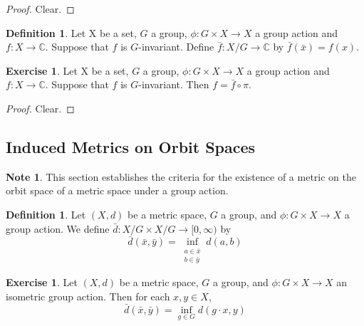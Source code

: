 \documentclass[12pt]{amsart}
\theoremstyle{definition}
\newtheorem{defn}[definition]{Definition}
\newtheorem{note}[definition]{Note}
\newtheorem{ex}[definition]{Exercise}
\newcommand{\C}{\mathbb{C}}
\newcommand{\Rg}{[0,\infty)}
\newcommand{\lex}[1]{\label{ex:#1}}
\newcommand{\ld}[1]{\label{defn:#1}}
\begin{document}
	\begin{proof}
	Clear.
	\end{proof}
	
	\begin{defn}
	Let X be a set, $G$ a group, $\phi: G \times X \rightarrow X$ a group action and $f:X \rightarrow \C$. Suppose that $f$ is $G$-invariant. Define $\bar{f}:X/ G \rightarrow \C$ by $\bar{f}(\bar{x}) = f(x)$. 
	\end{defn}
	
	\begin{ex}
	Let X be a set, $G$ a group, $\phi: G \times X \rightarrow X$ a group action and $f:X \rightarrow \C$. Suppose that $f$ is $G$-invariant. Then $f = \bar{f} \circ \pi$. 
	\end{ex}
	
	\begin{proof}
	Clear.
	\end{proof}
	
	
	
	
	
	
	
	
	
	\newpage
	\subsection{Induced Metrics on Orbit Spaces}
	
	\begin{note}
	This section establishes the criteria for the existence of a metric on the orbit space of a metric space under a group action. 
	\end{note}
	
	\begin{defn} \ld{}
	Let $(X, d)$ be a metric space, $G$ a group, and $\phi: G \times X \rightarrow X$ a group action. We define 
	$\bar{d}: X/G \times X / G \rightarrow \Rg$ by 
	$$\bar{d}(\bar{x}, \bar{y}) = \inf_{\substack{a \in \bar{x} \\ b \in \bar{y}}} d(a,b) $$
	\end{defn}
	
	\begin{ex} \lex{}
	Let $(X, d)$ be a metric space, $G$ a group, and $\phi: G \times X \rightarrow X$ an isometric group action. Then for each $x, y \in X$, $$\bar{d}(\bar{x}, \bar{y}) = \inf_{g \in G} d(g \cdot x, y)$$
	\end{ex}
	
\end{document}
